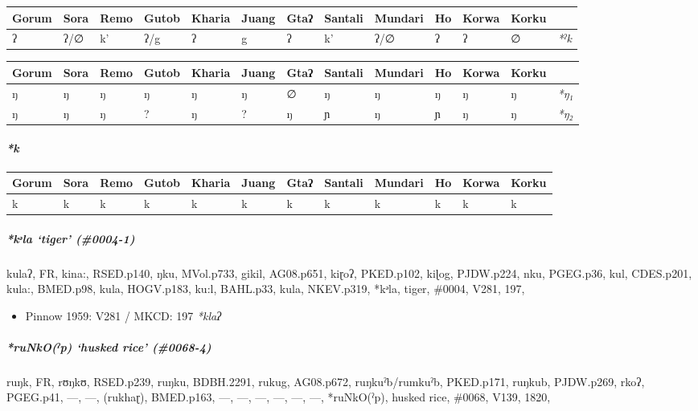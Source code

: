 \documentclass[a4paper,]{article}
\providecommand{\tightlist}{%
  \setlength{\itemsep}{0pt}\setlength{\parskip}{0pt}}
\let\oldparagraph\paragraph
\renewcommand{\paragraph}[1]{\oldparagraph{#1}\mbox{}}
\let\oldsubparagraph\subparagraph
\renewcommand{\subparagraph}[1]{\oldsubparagraph{#1}\mbox{}}
\begin{document}
\begin{longtable}[]{@{}lllllllllllll@{}}
\toprule
Gorum & Sora & Remo & Gutob & Kharia & Juang & Gtaʔ & Santali & Mundari
& Ho & Korwa & Korku &\tabularnewline
\midrule
\endhead
ʔ & ʔ/∅ & k' & ʔ/g & ʔ & g & ʔ & k' & ʔ/∅ & ʔ & ʔ & ∅ &
\emph{*ˀk}\tabularnewline
\bottomrule
\end{longtable}

\begin{longtable}[]{@{}lllllllllllll@{}}
\toprule
Gorum & Sora & Remo & Gutob & Kharia & Juang & Gtaʔ & Santali & Mundari
& Ho & Korwa & Korku &\tabularnewline
\midrule
\endhead
ŋ & ŋ & ŋ & ŋ & ŋ & ŋ & ∅ & ŋ & ŋ & ŋ & ŋ & ŋ &
\emph{*ŋ₁}\tabularnewline
ŋ & ŋ & ŋ & ? & ŋ & ? & ŋ & ɲ & ŋ & ɲ & ŋ & ŋ &
\emph{*ŋ₂}\tabularnewline
\bottomrule
\end{longtable}

\paragraph{\texorpdfstring{\emph{*k}}{*k}}\label{k}

\begin{longtable}[]{@{}llllllllllll@{}}
\toprule
Gorum & Sora & Remo & Gutob & Kharia & Juang & Gtaʔ & Santali & Mundari
& Ho & Korwa & Korku\tabularnewline
\midrule
\endhead
k & k & k & k & k & k & k & k & k & k & k & k\tabularnewline
\bottomrule
\end{longtable}

\subparagraph{\texorpdfstring{\emph{*kᵊla} `tiger'
(\#0004-1)}{*kᵊla tiger (\#0004-1)}}\label{kux1d4ala-tiger-0004-1}

kulaʔ, FR, kina:, RSED.p140, ŋku, MVol.p733, gikil, AG08.p651, kiɽoʔ,
PKED.p102, kiɭog, PJDW.p224, nku, PGEG.p36, kul, CDES.p201, kula:,
BMED.p98, kula, HOGV.p183, ku:l, BAHL.p33, kula, NKEV.p319, *kᵊla,
tiger, \#0004, V281, 197,

\begin{itemize}
\tightlist
\item
  Pinnow 1959: V281 / MKCD: 197 \emph{*klaʔ}
\end{itemize}

\subparagraph{\texorpdfstring{\emph{*ruNkO(ˀp)} `husked rice'
(\#0068-4)}{*ruNkO(ˀp) husked rice (\#0068-4)}}\label{runkoux2c0p-husked-rice-0068-4}

ruŋk, FR, rʊŋkʊ, RSED.p239, ruŋku, BDBH.2291, rukug, AG08.p672,
ruŋkuˀb/rumkuˀb, PKED.p171, ruŋkub, PJDW.p269, rkoʔ, PGEG.p41, ---, ---,
(rukhaɽ), BMED.p163, ---, ---, ---, ---, ---, ---, *ruNkO(ˀp), husked
rice, \#0068, V139, 1820,
\end{document}
